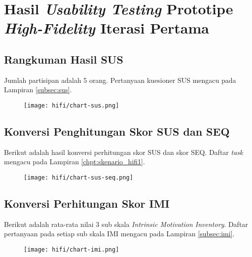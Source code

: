 \chapter{Hasil \textit{Usability Testing} Prototipe \textit{High-Fidelity} Iterasi Pertama}
\label{chpt:hasil_test_hifi1}

\section{Rangkuman Hasil SUS}
Jumlah partisipan adalah 5 orang.
Pertanyaan kuesioner SUS mengacu pada Lampiran \ref{subsec:sus}.

\begin{figure}[h]
  \centering
  \texttt{[image: hifi/chart-sus.png]}
\end{figure}


\section{Konversi Penghitungan Skor SUS dan SEQ}
Berikut adalah hasil konversi perhitungan skor SUS dan skor SEQ. Daftar \textit{task} mengacu pada Lampiran \ref{chpt:skenario_hifi1}.

\begin{figure}[h]
  \centering
  \texttt{[image: hifi/chart-sus-seq.png]}
\end{figure}




\newpage

\section{Konversi Perhitungan Skor IMI}
Berikut adalah rata-rata nilai 3 sub skala \textit{Intrinsic Motivation Inventory}. Daftar pertanyaan pada setiap sub skala IMI mengacu pada Lampiran \ref{subsec:imi}.

\begin{figure}[h]
  \centering
  \texttt{[image: hifi/chart-imi.png]}
\end{figure}